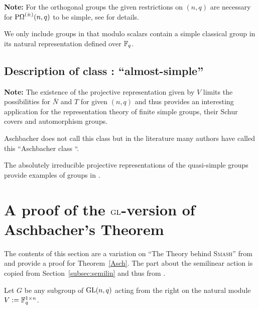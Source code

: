 \textbf{Note:} For the orthogonal groups the given restrictions on $(n,q)$
are necessary for $\POmega^{(\pm)}(n,q)$ to be simple, see
\cite[Section~2.4]{ATLAS} for details.

\medskip
{}
We only include groups in  that modulo scalars contain a simple 
classical group in its natural representation defined over $\mathbb{F}_q$.


\subsection{Description of class : ``almost-simple''}
\label{descC9}


\textbf{Note:} The existence of the projective representation given by $V$
limits the possibilities for $\bar N$ and $T$ for given $(n,q)$ and thus
provides an interesting application for the representation theory of finite
simple groups, their Schur covers and automorphism groups.

\medskip
{}
Aschbacher does not call this class  but in the literature many
authors have called this ``Aschbacher class ``.

\smallskip
\exmemb
The absolutely irreducible projective representations of the
quasi-simple groups provide examples of groups in .


\section{A proof of the $\mathbf{\GL}$-version of Aschbacher's Theorem}
\label{AschProof}

The contents of this section are a variation on ``The Theory behind
\textsc{Smash}'' from \cite[Section~2]{smashnormal} and provide a proof for
Theorem~\ref{Asch}. The part about the semilinear action is copied
from Section~\ref{subsec:semilin} and thus from 
\cite[Section~6.4]{subfieldpaper}.

Let $G$ be any subgroup of $\GL(n,q)$ acting from the right on the
natural module $V := \mathbb{F}_q^{1 \times n}$.

